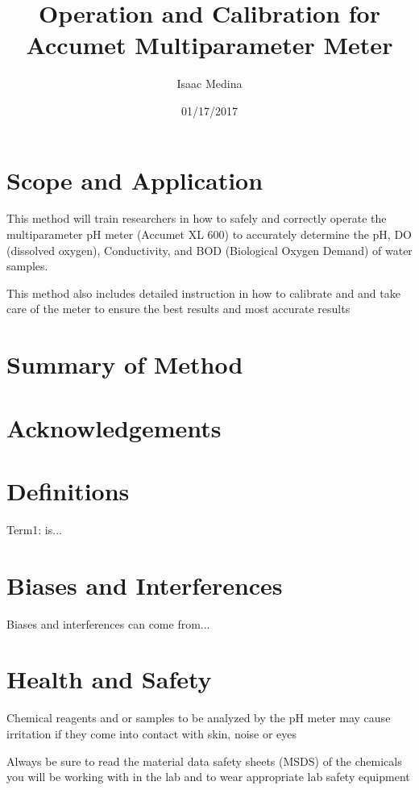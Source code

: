 \documentclass[12pt]{../SOP3_beta}
\title{Operation and Calibration for Accumet Multiparameter Meter}
\date{01/17/2017}
\author{Isaac Medina}
\begin{document}


\maketitle

\section{Scope and Application}

\NP This method will train researchers in how to safely and correctly operate the multiparameter pH meter (Accumet XL 600) to accurately determine the pH, DO (dissolved oxygen), Conductivity, and BOD (Biological Oxygen Demand) of water samples. 

\NP This method also includes detailed instruction in how to calibrate and and take care of the meter to ensure the best results and most accurate results

\section{Summary of Method}


\tableofcontents

\newpage

\section{Acknowledgements}

\section{Definitions}

\NP Term1: is...

\section{Biases and Interferences}

\NP Biases and interferences can come from...

\section{Health and Safety}

\NP Chemical reagents and or samples to be analyzed by the pH meter may cause irritation if they come into contact with skin, noise or eyes

\NP Always be sure to read the material data safety sheets (MSDS) of the chemicals you will be working with in the lab and to wear appropriate lab safety equipment
\end{document}

